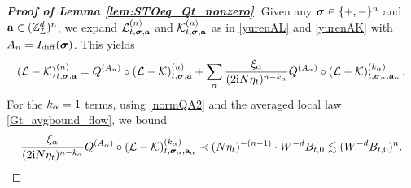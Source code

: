 \begin{proof}[\bf Proof of Lemma \ref{lem:STOeq_Qt_nonzero}]
Given any ${\boldsymbol{\sigma}}\in\{+,-\}^n$ and ${\mathbf{a}}\in ({\mathbb Z}_L^d)^n$, we expand $\mathcal L^{(n)}_{t,{\boldsymbol{\sigma}},{\mathbf{a}}}$ and $\mathcal K^{(n)}_{t,{\boldsymbol{\sigma}},{\mathbf{a}}}$ as in \eqref{yurenAL} and \eqref{yurenAK} with $A_n=I_{\mathrm{diff}}({\boldsymbol{\sigma}})$. This yields 
\begin{align}
\left({\mathcal L-\mathcal K}\right)^{(n)}_{t,{\boldsymbol{\sigma}},{\mathbf{a}}}=Q^{(A_n)}\circ \left({\mathcal L-\mathcal K}\right)^{(n)}_{t,{\boldsymbol{\sigma}},{\mathbf{a}}}+\sum_\alpha \frac{\xi_{\alpha}}{(2\mathrm{i} N\eta_t)^{n-k_\alpha}}   Q^{(A_\alpha)}\circ \left({\mathcal L-\mathcal K}\right)^{(k_\alpha)} _{t,{\boldsymbol{\sigma}}_{\alpha},{\mathbf{a}}_{\alpha}}.\label{eq:expandQAempty}
\end{align}
For the $k_\alpha=1$ terms, using \eqref{normQA2} and the averaged local law \eqref{Gt_avgbound_flow}, we bound 
\begin{align}\label{eq:kalpha1}
    \frac{\xi_{\alpha}}{(2\mathrm{i} N\eta_t)^{n-k_\alpha}}   Q^{(A_\alpha)}\circ (\mathcal L-\mathcal K)^{(k_\alpha)} _{t,{\boldsymbol{\sigma}}_{\alpha},{\mathbf{a}}_{\alpha}} \prec (N\eta_t)^{-(n-1)}\cdot W^{-d}B_{t,0} \lesssim (W^{-d}B_{t,0})^n.
\end{align}


\end{proof}
